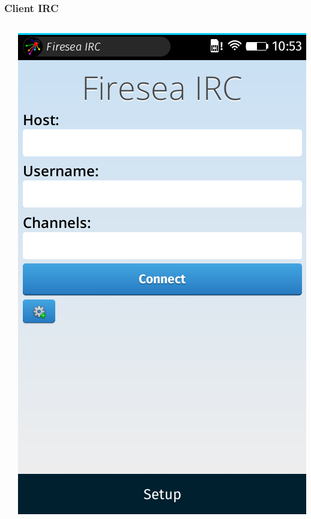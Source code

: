\documentclass{beamer}
\begin{document}
\begin{frame}
\frametitle{Client IRC}
\begin{columns}[T]
\begin{column}{5cm}
\begin{block}{}
\justifying{

}
\end{block} 
\end{column}
\begin{column}{5cm}
\includegraphics[scale=0.25] {./images/FFOS_IRC.png} 
\end{column}
\end{columns}  
\end{frame}
\end{document}
